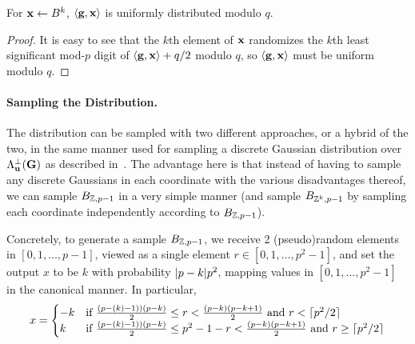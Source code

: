 \begin{lemma}\label{lem:uniformity}
For $\mathbf{x} \gets B^k$, $\langle\mathbf{g},\mathbf{x}\rangle$ is uniformly distributed
modulo $q$.  
\end{lemma}
\begin{proof}
It is easy to see that the $k$th element of $\mathbf{x}$ randomizes the $k$th
least significant mod-$p$ digit of $\langle\mathbf{g},\mathbf{x}\rangle+q/2$ modulo $q$, so
$\langle\mathbf{g},\mathbf{x}\rangle$ must be uniform modulo $q$. 
\end{proof}

\paragraph{Sampling the Distribution.} The distribution can be sampled
with two different approaches, or a hybrid of the two, in the same
manner used for sampling a discrete Gaussian distribution over
$\Lambda^{\perp}_{\mathbf{u}}(\mathbf{G})$ as described
in~\cite{DBLP:conf/eurocrypt/MicciancioP12}. The advantage here is
that instead of having to sample any discrete Gaussians in each
coordinate with the various disadvantages thereof, we can sample
$B_{\mathbb{Z},p-1}$ in a very simple manner (and sample $B_{\mathbb{Z}^k,p-1}$ by
sampling each coordinate independently according to $B_{\mathbb{Z},p-1}$).

Concretely, to generate a sample $B_{\mathbb{Z},p-1}$, we receive 2
(pseudo)random elements in $[0,1,\ldots,p-1]$, viewed as a single
element $r \in [0,1,\ldots,p^2-1]$, and set the output $x$ to be $k$ with
probability $\lvert p-k\rvert{p^2}$, mapping values in $[0,1,\ldots,p^2-1]$ in
the canonical manner. In particular,
\[x= \begin{cases}-k& \text{if }
  \tfrac{(p-(k)-1))(p-k)}{2} \leq r <
  \tfrac{(p-k)(p-k+1)}{2} \text{ and } r < \lceil p^2/2\rceil\\
k&\text{if }
  \tfrac{(p-(k)-1))(p-k)}{2} \leq p^2-1-r < \tfrac{(p-k)(p-k+1)}{2} \text{ and } r \geq \lceil p^2/2\rceil
\end{cases}
\]



